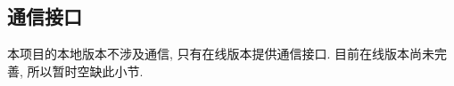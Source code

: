 \documentclass{ctexart}
\begin{document}
\subsection{通信接口}
本项目的本地版本不涉及通信, 只有在线版本提供通信接口. 目前在线版本尚未完善, 所以暂时空缺此小节.





\end{document}
